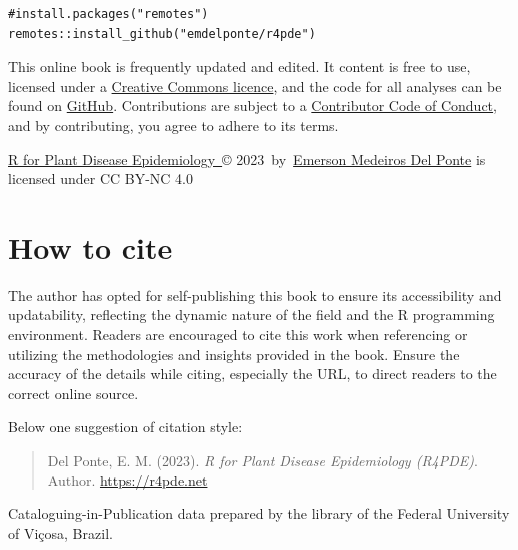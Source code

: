 \documentclass[
  letterpaper,
]{book}
\begin{document}
\begin{verbatim}
#install.packages("remotes")
remotes::install_github("emdelponte/r4pde")
\end{verbatim}

This online book is frequently updated and edited. It content is free to
use, licensed under a
\href{https://creativecommons.org/licenses/by-nc/4.0/}{Creative Commons
licence}, and the code for all analyses can be found on
\href{https://github.com/emdelponte/epidemiology-R}{GitHub}.
Contributions are subject to a
\href{https://contributor-covenant.org/version/2/0/CODE_OF_CONDUCT.html}{Contributor
Code of Conduct}, and by contributing, you agree to adhere to its terms.

\href{https://r4pde.net/}{R for Plant Disease Epidemiology~}©
2023~by~\href{http://emersondelponte.netlify.app/}{Emerson Medeiros Del
Ponte} is licensed under CC BY-NC 4.0


\hypertarget{how-to-cite}{%
\chapter*{How to cite}\label{how-to-cite}}


The author has opted for self-publishing this book to ensure its
accessibility and updatability, reflecting the dynamic nature of the
field and the R programming environment. Readers are encouraged to cite
this work when referencing or utilizing the methodologies and insights
provided in the book. Ensure the accuracy of the details while citing,
especially the URL, to direct readers to the correct online source.

Below one suggestion of citation style:

\begin{quote}
Del Ponte, E. M. (2023). \emph{R for Plant Disease Epidemiology
(R4PDE)}. Author. \href{https://r4pde.net/}{https://r4pde.net}
\end{quote}

Cataloguing-in-Publication data prepared by the library of the Federal
University of Viçosa, Brazil.
\end{document}
